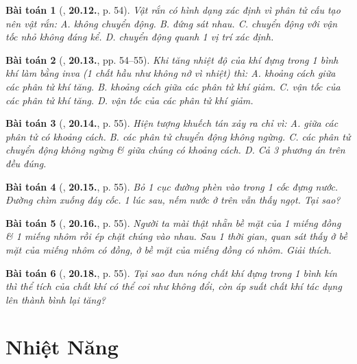 \documentclass{article}
\numberwithin{equation}{section}
\newtheorem{baitoan}{Bài toán}
\begin{document}
\begin{baitoan}[\cite{SBT_Vat_Ly_8}, \textbf{20.12.}, p. 54]
	Vật rắn có hình dạng xác định vì phân tử cấu tạo nên vật rắn: {\sf A.} không chuyển động. {\sf B.} đứng sát nhau. {\sf C.} chuyển động với vận tốc nhỏ không đáng kể. {\sf D.} chuyển động quanh 1 vị trí xác định.
\end{baitoan}

\begin{baitoan}[\cite{SBT_Vat_Ly_8}, \textbf{20.13.}, pp. 54--55]
	Khi tăng nhiệt độ của khí đựng trong 1 bình khí làm bằng inva (1 chất hầu như không nở vì nhiệt) thì: {\sf A.} khoảng cách giữa các phân tử khí tăng. {\sf B.} khoảng cách giữa các phân tử khí giảm. {\sf C.} vận tốc của các phân tử khí tăng. {\sf D.} vận tốc của các phân tử khí giảm.
\end{baitoan}

\begin{baitoan}[\cite{SBT_Vat_Ly_8}, \textbf{20.14.}, p. 55]
	Hiện tượng khuếch tán xảy ra chỉ vì: {\sf A.} giữa các phân tử có khoảng cách. {\sf B.} các phân tử chuyển động không ngừng. {\sf C.} các phân tử chuyển động không ngừng \& giữa chúng có khoảng cách. {\sf D.} Cả 3 phương án trên đều đúng.
\end{baitoan}

\begin{baitoan}[\cite{SBT_Vat_Ly_8}, \textbf{20.15.}, p. 55]
	Bỏ 1 cục đường phèn vào trong 1 cốc đựng nước. Đường chìm xuống đáy cốc. 1 lúc sau, nếm nước ở trên vẫn thấy ngọt. Tại sao?
\end{baitoan}

\begin{baitoan}[\cite{SBT_Vat_Ly_8}, \textbf{20.16.}, p. 55]
	Người ta mài thật nhẵn bề mặt của 1 miếng đồng \& 1 miếng nhôm rồi ép chặt chúng vào nhau. Sau 1 thời gian, quan sát thấy ở bề mặt của miếng nhôm có đồng, ở bề mặt của miếng đồng có nhôm. Giải thích.
\end{baitoan}

\begin{baitoan}[\cite{SBT_Vat_Ly_8}, \textbf{20.18.}, p. 55]
	Tại sao đun nóng chất khí đựng trong 1 bình kín thì thể tích của chất khí có thể coi như không đổi, còn áp suất chất khí tác dụng lên thành bình lại tăng?
\end{baitoan}


\section{Nhiệt Năng}
\end{document}
